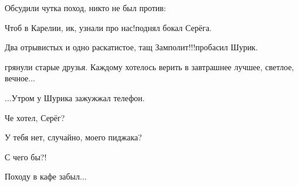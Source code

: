 {Обсудили чутка поход, никто не был против:

\diagdash Чтоб в Карелии, ик, узнали про нас!\mdash поднял бокал Серёга.

\diagdash Два отрывистых и одно раскатистое, тащ Замполит!!!\mdash пробасил Шурик.

\mdash грянули старые друзья. Каждому хотелось верить в завтрашнее лучшее, светлое, вечное$\ldots$

\vspace{1.5cm}

$\ldots$Утром у Шурика зажужжал телефон. 

\diagdash Че хотел, Серёг?

\diagdash У тебя нет, случайно, моего пиджака?

\diagdash С чего бы?!

\diagdash Походу в кафе забыл$\ldots$

\begin{center}
\end{center}
}